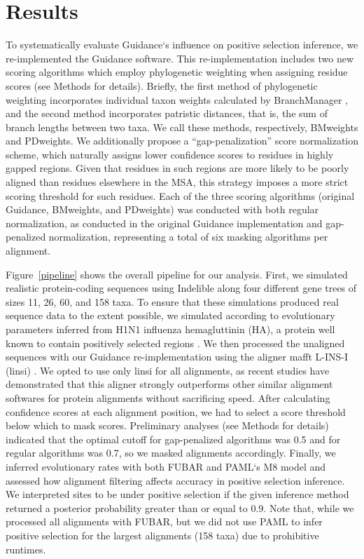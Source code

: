 \documentclass[10pt]{article}
\begin{document}
\section*{Results}
To systematically evaluate Guidance`s influence on positive selection inference, we re-implemented the Guidance software. This re-implementation includes two new scoring algorithms which employ phylogenetic weighting when assigning residue scores (see Methods for details). Briefly, the first method of phylogenetic weighting incorporates individual taxon weights calculated by BranchManager \citep{Stone2007}, and the second method incorporates patristic distances, that is, the sum of branch lengths between two taxa. We call these methods, respectively, BMweights and PDweights.  We additionally propose a “gap-penalization” score normalization scheme, which naturally assigns lower confidence scores to residues in highly gapped regions. Given that residues in such regions are more likely to be poorly aligned than residues elsewhere in the MSA, this strategy imposes a more strict scoring threshold for such residues. Each of the three scoring algorithms (original Guidance, BMweights, and PDweights) was conducted with both regular normalization, as conducted in the original Guidance implementation \citep{Penn2010} and gap-penalized normalization, representing a total of six masking algorithms per alignment.

Figure~\ref{pipeline} shows the overall pipeline for our analysis. First, we simulated realistic protein-coding sequences using Indelible \citep{Fletcher2009} along four different gene trees of sizes 11, 26, 60, and 158 taxa. To ensure that these simulations produced real sequence data to the extent possible, we simulated according to evolutionary parameters inferred from H1N1 influenza hemagluttinin (HA), a protein well known to contain positively selected regions \citep{Meyer2012}. We then processed the unaligned sequences with our Guidance re-implementation using the aligner mafft L-INS-I (linsi) \citep{Katoh2005}. We opted to use only linsi for all alignments, as recent studies have demonstrated that this aligner strongly outperforms other similar alignment softwares for protein alignments \citep{Thompson2011,Nuin2006} without sacrificing speed. After calculating confidence scores at each alignment position, we had to select a score threshold below which to mask scores. Preliminary analyses (see Methods for details) indicated that the optimal cutoff for gap-penalized algorithms was 0.5 and for regular algorithms was 0.7, so we masked alignments accordingly. Finally, we inferred evolutionary rates with both FUBAR \citep{Murrell2013} and PAML`s M8 model \citep{Yang2007} and assessed how alignment filtering affects accuracy in positive selection inference. We interpreted sites to be under positive selection if the given inference method returned a posterior probability greater than or equal to $0.9$. Note that, while we processed all alignments with FUBAR, but we did not use PAML to infer positive selection for the largest alignments (158 taxa) due to prohibitive runtimes. 
\end{document}
